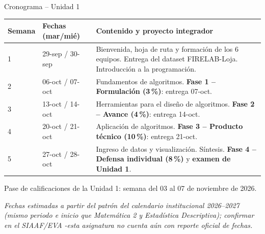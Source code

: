 \documentclass[aspectratio=169,11pt]{beamer}
\begin{document}
\begin{frame}{Cronograma -- Unidad 1}
\scriptsize
\renewcommand{\arraystretch}{1.1}
\begin{tabularx}{\textwidth}{C{1.6cm}L{2.6cm}Y}
\toprule
\textbf{Semana} & \textbf{Fechas (mar/mié)} & \textbf{Contenido y proyecto integrador} \\
 & 29-sep / 30-sep & Bienvenida, hoja de ruta y formación de los 6 equipos. Entrega del dataset FIRELAB-Loja. Introducción a la programación. \\
2 & 06-oct / 07-oct & Fundamentos de algoritmos. \textbf{Fase 1 -- Formulación (3\,\%)}: entrega 07-oct. \\
3 & 13-oct / 14-oct & Herramientas para el diseño de algoritmos. \textbf{Fase 2 -- Avance (4\,\%)}: entrega 14-oct. \\
4 & 20-oct / 21-oct & Aplicación de algoritmos. \textbf{Fase 3 -- Producto técnico (10\,\%)}: entrega 21-oct. \\
5 & 27-oct / 28-oct & Ingreso de datos y visualización. Síntesis. \textbf{Fase 4 -- Defensa individual (8\,\%)} y \textbf{examen de Unidad 1}. \\
\bottomrule
\end{tabularx}
\vspace{0.15cm}
\begin{techbox}
Pase de calificaciones de la Unidad 1: semana del 03 al 07 de noviembre de 2026.
\end{techbox}
\tiny\textit{Fechas estimadas a partir del patrón del calendario institucional 2026--2027 (mismo periodo e inicio que Matemática 2 y Estadística Descriptiva); confirmar en el SIAAF/EVA -esta asignatura no cuenta aún con reporte oficial de fechas.}
\end{frame}
\end{document}
